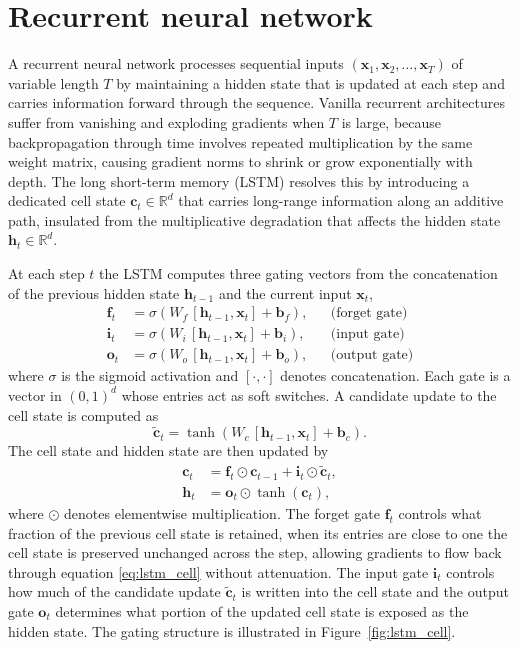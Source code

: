 \section{Recurrent neural network}

A recurrent neural network processes sequential inputs $(\mathbf{x}_1,\mathbf{x}_2,\dots,\mathbf{x}_T)$ of variable length $T$ by maintaining a hidden state that is updated at each step and carries information forward through the sequence.  Vanilla recurrent architectures suffer from vanishing and exploding gradients when $T$ is large, because backpropagation through time involves repeated multiplication by the same weight matrix, causing gradient norms to shrink or grow exponentially with depth.  The long short-term memory (LSTM) \cite{Hochreiter_LSTM_1997} resolves this by introducing a dedicated cell state $\mathbf{c}_t\in\mathbb{R}^{d}$ that carries long-range information along an additive path, insulated from the multiplicative degradation that affects the hidden state $\mathbf{h}_t\in\mathbb{R}^{d}$.

At each step $t$ the LSTM computes three gating vectors from the concatenation of the previous hidden state $\mathbf{h}_{t-1}$ and the current input $\mathbf{x}_t$,
\begin{align}
\mathbf{f}_{t} &= \sigma\!\left(W_{f}\,[\mathbf{h}_{t-1},\mathbf{x}_{t}]+\mathbf{b}_{f}\right), &&\text{(forget gate)}\\[3pt]
\mathbf{i}_{t} &= \sigma\!\left(W_{i}\,[\mathbf{h}_{t-1},\mathbf{x}_{t}]+\mathbf{b}_{i}\right), &&\text{(input gate)}\\[3pt]
\mathbf{o}_{t} &= \sigma\!\left(W_{o}\,[\mathbf{h}_{t-1},\mathbf{x}_{t}]+\mathbf{b}_{o}\right), &&\text{(output gate)}
\end{align}
where $\sigma$ is the sigmoid activation and $[\cdot,\cdot]$ denotes concatenation.  Each gate is a vector in $(0,1)^d$ whose entries act as soft switches.  A candidate update to the cell state is computed as
\begin{equation}
\tilde{\mathbf{c}}_{t} = \tanh\!\left(W_{c}\,[\mathbf{h}_{t-1},\mathbf{x}_{t}]+\mathbf{b}_{c}\right).
\end{equation}
The cell state and hidden state are then updated by
\begin{align}
\mathbf{c}_{t} &= \mathbf{f}_{t}\odot\mathbf{c}_{t-1} + \mathbf{i}_{t}\odot\tilde{\mathbf{c}}_{t}, \label{eq:lstm_cell}\\[3pt]
\mathbf{h}_{t} &= \mathbf{o}_{t}\odot\tanh(\mathbf{c}_{t}), \label{eq:lstm_hidden}
\end{align}
where $\odot$ denotes elementwise multiplication.  The forget gate $\mathbf{f}_t$ controls what fraction of the previous cell state is retained, when its entries are close to one the cell state is preserved unchanged across the step, allowing gradients to flow back through equation \eqref{eq:lstm_cell} without attenuation.  The input gate $\mathbf{i}_t$ controls how much of the candidate update $\tilde{\mathbf{c}}_t$ is written into the cell state and the output gate $\mathbf{o}_t$ determines what portion of the updated cell state is exposed as the hidden state.  The gating structure is illustrated in Figure~\ref{fig:lstm_cell}.

